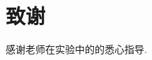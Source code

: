 \documentclass[a4paper]{article}
\begin{document}

\section{致谢}\label{acknowledgments}
感谢老师在实验中的的悉心指导.

\nocite{*}
\end{document}
